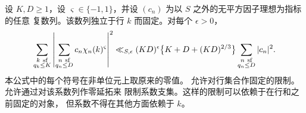 \begin{lemma}[六次大筛法]\label{lem:sextic-large-sieve}
设 $K,D\ge1$，设 $\varsigma\in\{-1,1\}$，并设 $(c_n)$ 为以 $S$ 之外的无平方因子理想为指标的任意
复数列。该数列独立于行 $k$ 而固定。对每个
$\epsilon>0$，
\begin{equation}\label{eq:sextic-large-sieve}
 \sum_{\substack{k\ {\rm sf}\\q_k\le K}}
 \left|\sum_{\substack{n\ {\rm sf}\\q_n\le D}}
       c_n\chi_n(k)^{\varsigma}\right|^2
 \ll_{S,\epsilon}(KD)^\epsilon
       \bigl\{K+D+(KD)^{2/3}\bigr\}
       \sum_{\substack{n\ {\rm sf}\\q_n\le D}}|c_n|^2.
\end{equation}
本公式中的每个符号在非单位元上取原来的零值。
允许对行集合作固定的限制。允许通过对该系数列作零延拓来
限制系数支集。这样的限制可以依赖于在行和之前固定的对象，
但系数不得在其他方面依赖于 $k$。
\end{lemma}

